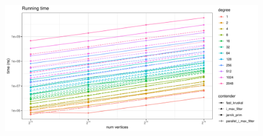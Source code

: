 \documentclass{article}
\begin{document}
\begin{figure}[htpb]
  \centering
  \includegraphics[width=\linewidth, page=5]{../plots/13_16_1_2048_255_1_2.pdf}
  \caption{}%
  \label{fig:13_16_1_2048_255_1_2}
\end{figure}
\end{document}
